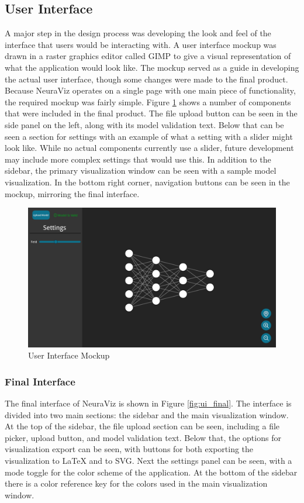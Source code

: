 \subsection{User Interface}
A major step in the design process was developing the look and feel of the interface that users would be interacting with. A user interface mockup was drawn in a raster graphics editor called GIMP \cite{gimp} to give a visual representation of what the application would look like. The mockup served as a guide in developing the actual user interface, though some changes were made to the final product. Because NeuraViz operates on a single page with one main piece of functionality, the required mockup was fairly simple. Figure \ref{fig:ui_mockup} shows a number of components that were included in the final product. The file upload button can be seen in the side panel on the left, along with its model validation text. Below that can be seen a section for settings with an example of what a setting with a slider might look like. While no actual components currently use a slider, future development may include more complex settings that would use this. In addition to the sidebar, the primary visualization window can be seen with a sample model visualization. In the bottom right corner, navigation buttons can be seen in the mockup, mirroring the final interface.

\begin{figure}[ht]
    \centering
    \includegraphics[width=1\textwidth]{../docs/mockups/Main.png}
    \caption{User Interface Mockup}
    \label{fig:ui_mockup}
\end{figure}

\subsubsection{Final Interface}
The final interface of NeuraViz is shown in Figure \ref{fig:ui_final}. The interface is divided into two main sections: the sidebar and the main visualization window. At the top of the sidebar, the file upload section can be seen, including a file picker, upload button, and model validation text. Below that, the options for visualization export can be seen, with buttons for both exporting the visualization to \LaTeX{} and to SVG. Next the settings panel can be seen, with a mode toggle for the color scheme of the application. At the bottom of the sidebar there is a color reference key for the colors used in the main visualization window. 

